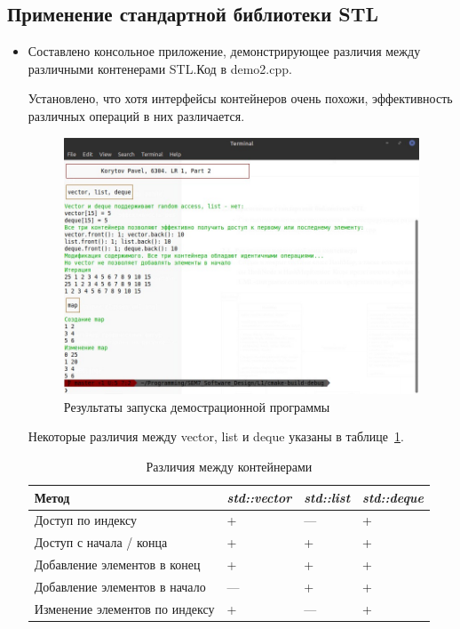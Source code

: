 \documentclass[a4paper, 14pt]{extarticle}
\begin{document}
\subsection{Применение стандартной библиотеки STL}
\begin{itemize}
    \item Составлено консольное приложение, демонстрирующее различия между различными контенерами STL.\@ Код в demo2.cpp.
    
    Установлено, что хотя интерфейсы контейнеров очень похожи, эффективность различных операций в них различается.

    \begin{figure}[h]
        \centering
        \includegraphics[width=\textwidth]{./img/S010.jpg}
        \caption{Результаты запуска демострационной программы}%
        \label{img:stl:demo}
    \end{figure}

    Некоторые различия между vector, list и deque указаны в таблице~\ref{tab:stl:diff}.
    \begin{table}[h]
        \centering
        \caption{Различия между контейнерами}
        \begin{tabular}{@{}llll@{}}
        \toprule
        \textbf{Метод} & \textit{std::vector} & \textit{std::list} & \textit{std::deque} \\ \midrule
        Доступ по индексу & + & --- & + \\
        Доступ с начала / конца & + & + & + \\ \midrule
        Добавление элементов в конец & + & + & + \\
        Добавление элементов в начало & --- & + & + \\
        Изменение элементов по индексу & + & --- & + \\ \bottomrule
        \end{tabular}%
        \label{tab:stl:diff}
    \end{table}

\end{itemize}
\end{document}
